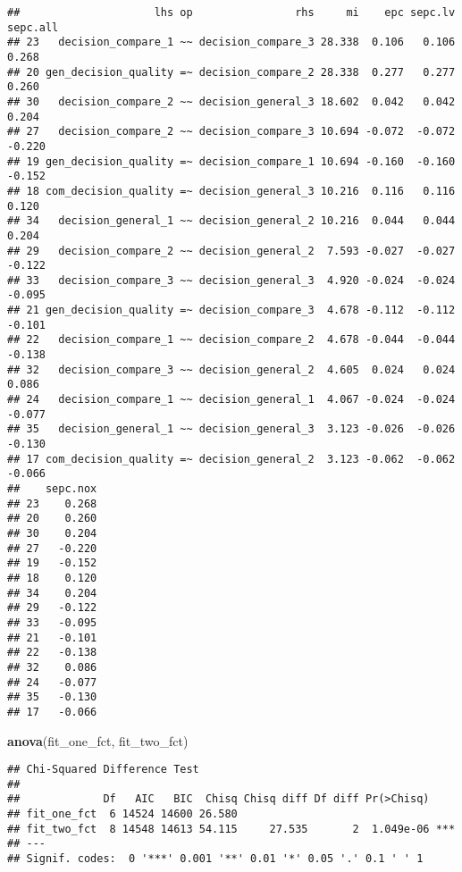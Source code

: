\documentclass[]{article}
\newenvironment{Shaded}{\begin{snugshade}}{\end{snugshade}}
\newcommand{\KeywordTok}[1]{\textcolor[rgb]{0.13,0.29,0.53}{\textbf{#1}}}
\newcommand{\NormalTok}[1]{#1}
\begin{document}
\begin{verbatim}
##                     lhs op                rhs     mi    epc sepc.lv sepc.all
## 23   decision_compare_1 ~~ decision_compare_3 28.338  0.106   0.106    0.268
## 20 gen_decision_quality =~ decision_compare_2 28.338  0.277   0.277    0.260
## 30   decision_compare_2 ~~ decision_general_3 18.602  0.042   0.042    0.204
## 27   decision_compare_2 ~~ decision_compare_3 10.694 -0.072  -0.072   -0.220
## 19 gen_decision_quality =~ decision_compare_1 10.694 -0.160  -0.160   -0.152
## 18 com_decision_quality =~ decision_general_3 10.216  0.116   0.116    0.120
## 34   decision_general_1 ~~ decision_general_2 10.216  0.044   0.044    0.204
## 29   decision_compare_2 ~~ decision_general_2  7.593 -0.027  -0.027   -0.122
## 33   decision_compare_3 ~~ decision_general_3  4.920 -0.024  -0.024   -0.095
## 21 gen_decision_quality =~ decision_compare_3  4.678 -0.112  -0.112   -0.101
## 22   decision_compare_1 ~~ decision_compare_2  4.678 -0.044  -0.044   -0.138
## 32   decision_compare_3 ~~ decision_general_2  4.605  0.024   0.024    0.086
## 24   decision_compare_1 ~~ decision_general_1  4.067 -0.024  -0.024   -0.077
## 35   decision_general_1 ~~ decision_general_3  3.123 -0.026  -0.026   -0.130
## 17 com_decision_quality =~ decision_general_2  3.123 -0.062  -0.062   -0.066
##    sepc.nox
## 23    0.268
## 20    0.260
## 30    0.204
## 27   -0.220
## 19   -0.152
## 18    0.120
## 34    0.204
## 29   -0.122
## 33   -0.095
## 21   -0.101
## 22   -0.138
## 32    0.086
## 24   -0.077
## 35   -0.130
## 17   -0.066
\end{verbatim}

\begin{Shaded}
\begin{Highlighting}[]
\KeywordTok{anova}\NormalTok{(fit_one_fct, fit_two_fct)}
\end{Highlighting}
\end{Shaded}

\begin{verbatim}
## Chi-Squared Difference Test
## 
##             Df   AIC   BIC  Chisq Chisq diff Df diff Pr(>Chisq)    
## fit_one_fct  6 14524 14600 26.580                                  
## fit_two_fct  8 14548 14613 54.115     27.535       2  1.049e-06 ***
## ---
## Signif. codes:  0 '***' 0.001 '**' 0.01 '*' 0.05 '.' 0.1 ' ' 1
\end{verbatim}
\end{document}

